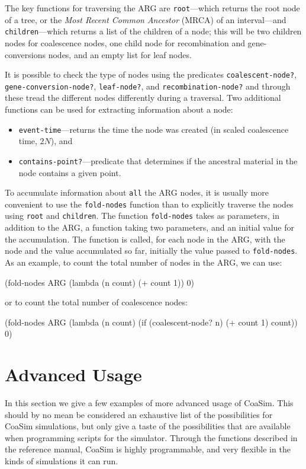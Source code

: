 \documentclass{manual}
\begin{document}
The key functions for traversing the ARG are \texttt{root}---which
returns the root node of a tree, or the \emph{Most Recent Common
  Ancestor} (MRCA) of an interval---and \texttt{children}---which
returns a list of the children of a node; this will be two children
nodes for coalescence nodes, one child node for recombination and
gene-conversions nodes, and an empty list for leaf nodes.

It is possible to check the type of nodes using the predicates
\texttt{coalescent-node?}, \texttt{gene-conversion-node?},
\texttt{leaf-node?}, and \texttt{recombination-node?} and through
these tread the different nodes differently during a traversal.  Two
additional functions can be used for extracting information about a
node:
\begin{itemize}
\item \texttt{event-time}---returns the time the node was created (in
  scaled coalescence time, $2N$), and
\item \texttt{contains-point?}---predicate that determines if the
  ancestral material in the node contains a given point.
\end{itemize}

To accumulate information about \texttt{all} the ARG nodes, it is
usually more convenient to use the \texttt{fold-nodes} function than
to explicitly traverse the nodes using \texttt{root} and
\texttt{children}.  The function \texttt{fold-nodes} takes as
parameters, in addition to the ARG, a function taking two parameters,
and an initial value for the accumulation.  The function is called,
for each node in the ARG, with the node and the value accumulated so
far, initially the value passed to \texttt{fold-nodes}.  As an
example, to count the total number of nodes in the ARG, we can use:
\begin{code}
(fold-nodes ARG (lambda (n count) (+ count 1)) 0)
\end{code}
or to count the total number of coalescence nodes:
\begin{code}
(fold-nodes ARG 
            (lambda (n count) 
               (if (coalescent-node? n) (+ count 1) count)) 
            0)
\end{code}


\section{Advanced Usage}
\label{sec:advanced-usage}

In this section we give a few examples of more advanced usage of
CoaSim.  This should by no mean be considered an exhaustive list of
the possibilities for CoaSim simulations, but only give a taste of the
possibilities that are available when programming scripts for the
simulator.  Through the functions described in the reference manual,
CoaSim is highly programmable, and very flexible in the kinds of
simulations it can run.
\end{document}
